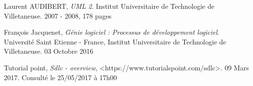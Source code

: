 \documentclass[12pt,a4paper,oneside]{book}
\begin{document}
\begin{thebibliography}{9}
	
	Laurent AUDIBERT, \emph{UML 2}. Institut Universitaire de Technologie de Villetaneuse. 2007 - 2008, 178 pages
	
	
	François Jacquenet, \emph{Génie logiciel : Processus de développement logiciel}. Université Saint Etienne - France, Institut Universitaire de Technologie de Villetaneuse. 03 Octobre 2016
	
	
	Tutorial point, \emph{Sdlc - overview}, <https://www.tutorialspoint.com/sdlc>. 09 Mars 2017. Consulté le 25/05/2017 à 17h00
	
	
	
	
	
\end{thebibliography}







\appendix














\renewcommand{\contentsname}{Table des matières} 
\setcounter{tocdepth}{3}
\tableofcontents
{}
\end{document}
